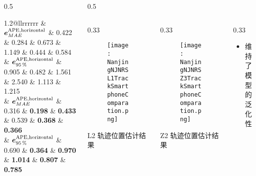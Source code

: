 \begin{frame}
\begin{columns}[t]
\begin{column}{0.5\textwidth}
{{\begin{tabular*}{1.2\linewidth}{@{\extracolsep{\fill}}llrrrrrr}
				& $\vb*{e}^{\mathrm{APE,horizontal}}_{MAE}$ & 0.422 & 0.284 & 0.673 & 1.149 & 0.444 & 0.584 \\
				& $\vb*{e}^{\mathrm{APE,horizontal}}_{\SI{95}{\percent}}$ & 0.905 & 0.482 & 1.561 & 2.540 & 1.113 & 1.215 \\
				\midrule
				& $\vb*{e}^{\mathrm{APE,horizontal}}_{MAE}$ & 0.316 & \textbf{0.198} & \textbf{0.433} & 0.539 & \textbf{0.368} & \textbf{0.366} \\
				& $\vb*{e}^{\mathrm{APE,horizontal}}_{\SI{95}{\percent}}$ & 0.690 & \textbf{0.364} & \textbf{0.970} & \textbf{1.014} & \textbf{0.807} & \textbf{0.785} \\
				\bottomrule 
			\end{tabular*} 	
		}}
		\end{column}   
		\begin{column}{0.5\textwidth}
		    \vspace{-4.5cm}
			\begin{columns}[t]
					\begin{column}{0.33\textwidth}
					   	\begin{figure}
						    \texttt{[image: NanjingNJNRSL1TrackSmartphoneComparation.png]}
					   	\end{figure}
					   	\vspace{-0.5cm}
		   			   	\hspace{0.0cm} {\tiny L2 轨迹位置估计结果}
					\end{column}   
					\begin{column}{0.33\textwidth}
					   	\begin{figure}
					   	\centering
					   	    \texttt{[image: NanjingNJNRSZ3TrackSmartphoneComparation.png]}
					   	\end{figure}
					   	\vspace{-0.5cm}
		   			   	\hspace{0.0cm} {\tiny Z2 轨迹位置估计结果}
					\end{column}
					\begin{column}{0.33\textwidth}
					    \vspace{1cm}
						{\small 						
							\begin{itemize}
								\item 维持了模型的泛化性
							\end{itemize}
						}
					\end{column}
				\end{columns}
		\end{column}
	\end{columns}
\end{frame}

